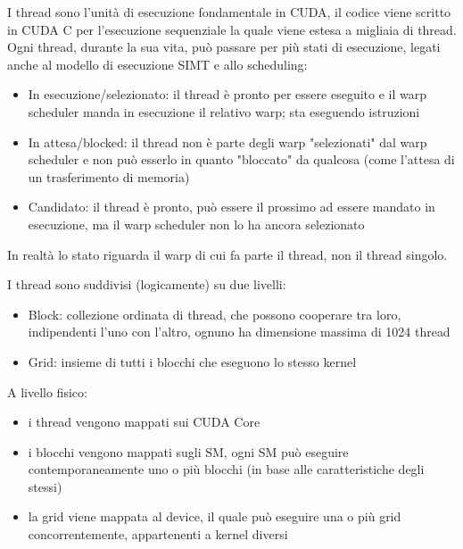 \begin{questions}
    \begin{solution}
    	I thread sono l'unità di esecuzione fondamentale in CUDA, il codice viene scritto in CUDA C per l'esecuzione sequenziale la quale viene estesa a migliaia di thread. Ogni thread, durante la sua vita, può passare per più stati di esecuzione, legati anche al modello di esecuzione SIMT e allo scheduling:
    	\begin{itemize}
    		\item In esecuzione/selezionato: il thread è pronto per essere eseguito e il warp scheduler manda in esecuzione il relativo warp; sta eseguendo istruzioni
    		
    		\item In attesa/blocked: il thread non è parte degli warp "selezionati" dal warp scheduler e non può esserlo in quanto "bloccato" da qualcosa (come l'attesa di un trasferimento di memoria)
    		
    		\item Candidato: il thread è pronto, può essere il prossimo ad essere mandato in esecuzione, ma il warp scheduler non lo ha ancora selezionato
    	\end{itemize}
    	In realtà lo stato riguarda il warp di cui fa parte il thread, non il thread singolo.
    	
    	I thread sono suddivisi (logicamente) su due livelli: 
    	\begin{itemize}
    		\item Block: collezione ordinata di thread, che possono cooperare tra loro, indipendenti l'uno con l'altro, ognuno ha dimensione massima di 1024 thread
    		
    		\item Grid: insieme di tutti i blocchi che eseguono lo stesso kernel
    	\end{itemize}
    	
    	A livello fisico: 
    	\begin{itemize}
    		\item i thread vengono mappati sui CUDA Core
    		
    		\item i blocchi vengono mappati sugli SM, ogni SM può eseguire contemporaneamente uno o più blocchi (in base alle caratteristiche degli stessi)
    		
    		\item la grid viene mappata al device, il quale può eseguire una o più grid concorrentemente, appartenenti a kernel diversi
    		

\end{itemize}
\end{solution}
\end{questions}
